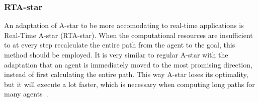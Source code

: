 			\subsubsection{RTA-star}
				An adaptation of A-star to be more accomodating to real-time applications is Real-Time A-star (RTA-star). When the computational resources are insufficient to at every step recalculate the entire path from the agent to the goal, this method should be employed. It is very similar to regular A-star with the adaptation that an agent is immediately moved to the most promising direction, instead of first calculating the entire path. This way A-star loses its optimality, but it will execute a lot faster, which is necessary when computing long paths for many agents~\cite{korf1990real}.